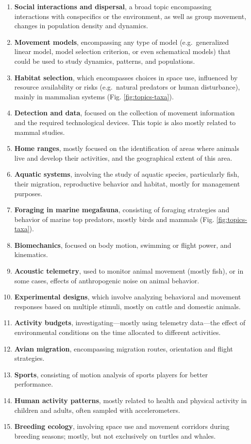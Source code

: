 \documentclass[a4paper,12pt]{article}
\begin{document}
\begin{enumerate}
	\def\labelenumi{\arabic{enumi})}
	\item
	\textbf{Social interactions and dispersal}, a broad topic encompassing
	interactions with conspecifics or the environment, as well as group
	movement, changes in population density and dynamics.
	\item
	\textbf{Movement models}, encompassing any type of model
	(e.g.~generalized linear model, model selection criterion, or even
	schematical models) that could be used to study dynamics, patterns,
	and populations.
	\item
	\textbf{Habitat selection}, which encompasses choices in space use,
	influenced by resource availability or risks (e.g.~natural predators
	or human disturbance), mainly in mammalian systems (Fig.
	\ref{fig:topics-taxa}).
	\item
	\textbf{Detection and data}, focused on the collection of movement
	information and the required technological devices. This topic is also
	mostly related to mammal studies.
	\item
	\textbf{Home ranges}, mostly focused on the identification of areas
	where animals live and develop their activities, and the geographical
	extent of this area.
	\item
	\textbf{Aquatic systems}, involving the study of aquatic species,
	particularly fish, their migration, reproductive behavior and habitat,
	mostly for management purposes.
	\item
	\textbf{Foraging in marine megafauna}, consisting of foraging
	strategies and behavior of marine top predators, mostly birds and
	mammals (Fig. \ref{fig:topics-taxa}).
	\item
	\textbf{Biomechanics}, focused on body motion, swimming or flight
	power, and kinematics.
	\item
	\textbf{Acoustic telemetry}, used to monitor animal movement (mostly
	fish), or in some cases, effects of anthropogenic noise on animal
	behavior.
	\item
	\textbf{Experimental designs}, which involve analyzing behavioral and
	movement responses based on multiple stimuli, mostly on cattle and
	domestic animals.
	\item
	\textbf{Activity budgets}, investigating---mostly using telemetry
	data---the effect of environmental conditions on the time allocated to
	different activities.
	\item
	\textbf{Avian migration}, encompassing migration routes, orientation
	and flight strategies.
	\item
	\textbf{Sports}, consisting of motion analysis of sports players for
	better performance.
	\item
	\textbf{Human activity patterns}, mostly related to health and
	physical activity in children and adults, often sampled with
	accelerometers.
	\item
	\textbf{Breeding ecology}, involving space use and movement corridors
	during breeding seasons; mostly, but not exclusively on turtles and
	whales.
\end{enumerate}
\end{document}
